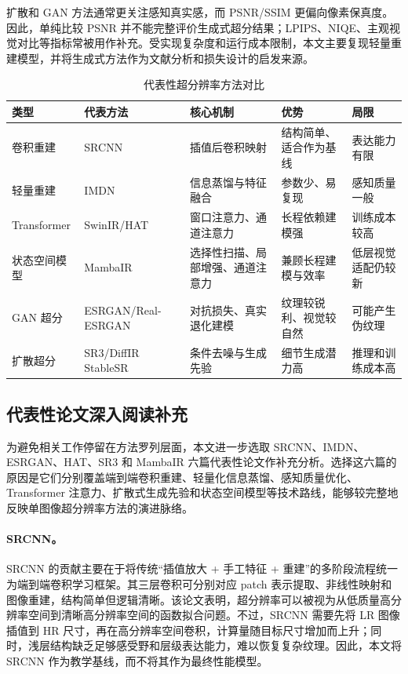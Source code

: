 \documentclass[bwprint]{report}
\begin{document}
扩散和 GAN 方法通常更关注感知真实感，而 PSNR/SSIM 更偏向像素保真度。因此，单纯比较 PSNR 并不能完整评价生成式超分结果；LPIPS、NIQE、主观视觉对比等指标常被用作补充。受实现复杂度和运行成本限制，本文主要复现轻量重建模型，并将生成式方法作为文献分析和损失设计的启发来源。

\begin{table}[H]
    \centering
    \caption{代表性超分辨率方法对比}
    \label{tab:literature-comparison}
    \small
    \begin{tabular}{>{\raggedright\arraybackslash}p{1.9cm}>{\raggedright\arraybackslash}p{2.1cm}>{\raggedright\arraybackslash}p{2.9cm}>{\raggedright\arraybackslash}p{2.6cm}>{\raggedright\arraybackslash}p{2.4cm}}
        \toprule
        类型 & 代表方法 & 核心机制 & 优势 & 局限 \\
        \midrule
        卷积重建 & SRCNN & 插值后卷积映射 & 结构简单、适合作为基线 & 表达能力有限 \\
        轻量重建 & IMDN & 信息蒸馏与特征融合 & 参数少、易复现 & 感知质量一般 \\
        Transformer & SwinIR/HAT & 窗口注意力、通道注意力 & 长程依赖建模强 & 训练成本较高 \\
        状态空间模型 & MambaIR & 选择性扫描、局部增强、通道注意力 & 兼顾长程建模与效率 & 低层视觉适配仍较新 \\
        GAN 超分 & ESRGAN/Real-ESRGAN & 对抗损失、真实退化建模 & 纹理较锐利、视觉较自然 & 可能产生伪纹理 \\
        扩散超分 & \makecell[l]{SR3/DiffIR\\StableSR} & 条件去噪与生成先验 & 细节生成潜力高 & 推理和训练成本高 \\
        \bottomrule
    \end{tabular}
\end{table}

\subsection{代表性论文深入阅读补充}
为避免相关工作停留在方法罗列层面，本文进一步选取 SRCNN、IMDN、ESRGAN、HAT、SR3 和 MambaIR 六篇代表性论文作补充分析。选择这六篇的原因是它们分别覆盖端到端卷积重建、轻量化信息蒸馏、感知质量优化、Transformer 注意力、扩散式生成先验和状态空间模型等技术路线，能够较完整地反映单图像超分辨率方法的演进脉络。

\paragraph{SRCNN。}
SRCNN 的贡献主要在于将传统“插值放大 + 手工特征 + 重建”的多阶段流程统一为端到端卷积学习框架\cite{dong2016srcnn}。其三层卷积可分别对应 patch 表示提取、非线性映射和图像重建，结构简单但逻辑清晰。该论文表明，超分辨率可以被视为从低质量高分辨率空间到清晰高分辨率空间的函数拟合问题。不过，SRCNN 需要先将 LR 图像插值到 HR 尺寸，再在高分辨率空间卷积，计算量随目标尺寸增加而上升；同时，浅层结构缺乏足够感受野和层级表达能力，难以恢复复杂纹理。因此，本文将 SRCNN 作为教学基线，而不将其作为最终性能模型。
\end{document}
